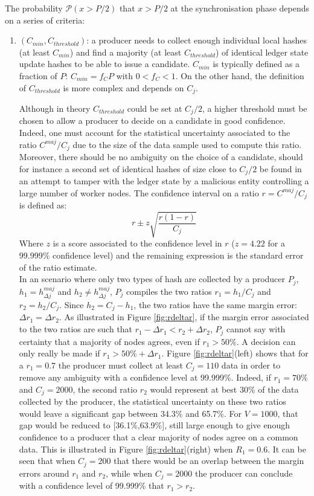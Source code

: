 The probability $\mathcal{P}(x>P/2)$ that $x >P/2$ at the synchronisation phase depends on a series of criteria:
\begin{enumerate}
\item $(C_{min}, C_{threshold})$: a producer needs to collect enough individual local hashes (at least $C_{min}$) and find a majority (at least $C_{threshold}$) of identical ledger state update hashes to be able to issue a candidate. 
$C_{min}$ is typically defined as a fraction of $P$: $C_{min} = f_C P$ with $0 < f_C < 1$. On the other hand, the definition of $C_{threshold}$ is more complex and depends on $C_j$. 

 Although in theory $C_{threshold}$ could be set at $C_j/2$,  a higher threshold must be chosen to allow a producer to decide on a candidate in good confidence. Indeed, one must account for the statistical uncertainty associated to the ratio $C^{maj}/C_j$ due to the size of the data sample used to compute this ratio. Moreover, there should be no ambiguity on the choice of a candidate,  should for instance a second set of identical hashes of size close to $C_j/2$ be found  in an attempt to tamper with the ledger state by a malicious entity controlling a large number of worker nodes. The confidence interval on a ratio $r=C^{maj}/C_j$ is defined as:
 \begin{equation}
 r \pm z\sqrt{\frac{r(1-r)}{C_j}}
 \end{equation}
 Where $z$ is a score associated to the confidence level in $r$ ($z=4.22$ for a 99.999\% confidence level) and the remaining expression is the standard error of the ratio estimate. \\
 
 In an scenario where only two types of hash are collected by a producer $P_j$, $h_1 =h^{maj}_{\Delta j}$ and $h_2 \neq h^{maj}_{\Delta j}$, $P_j$ compiles the two ratios $r_1 = h_1/C_j$ and $r_2 = h_2 /C_j$. Since $h_2 = C_j - h_1$, the two ratios have the same margin error: $\Delta r_1 = \Delta r_2$. As illustrated in Figure \ref{fig:rdeltar}, if the margin error associated to the two ratios are such that $r_1 - \Delta r_1 < r_2 + \Delta r_2$, $P_j$ cannot say with certainty that a majority of nodes agrees, even if $r_1 > 50\%$. A decision can only really be made if $r_1 > 50\% + \Delta r_1$. Figure \ref{fig:rdeltar}(left) shows that for a $r_{1} = 0.7$ the producer must collect at least $C_j=110$ data in order to remove any ambiguity with a confidence level at 99.999\%. Indeed, if $r_1 = 70\%$ and $C_j=2000$, the second ratio $r_2$ would represent at best 30\% of the data collected by the producer, the statistical uncertainty on these two ratios would leave a significant gap between 34.3\% and 65.7\%. For $V= 1000$, that gap would be reduced to [36.1\%,63.9\%], still large enough to give enough confidence to a producer that a clear majority of nodes agree on a common data. This is illustrated in Figure \ref{fig:rdeltar}(right) when $R_1 = 0.6$. It can be seen that when $C_j = 200$ that there would be an overlap between the margin errors around $r_1$ and $r_2$, while when $C_j = 2000$ the producer can conclude with a confidence level of 99.999\% that $r_1 > r_2$.\\


\end{enumerate}
